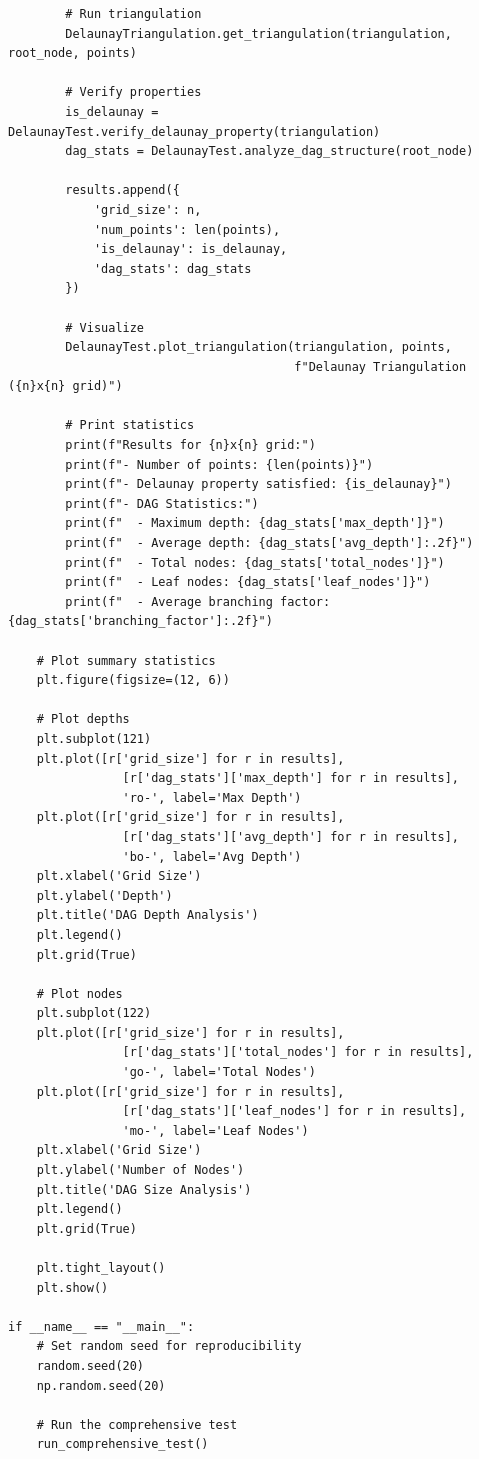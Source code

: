 \documentclass{article}
\begin{document}
\begin{lstlisting}
        # Run triangulation
        DelaunayTriangulation.get_triangulation(triangulation, root_node, points)
        
        # Verify properties
        is_delaunay = DelaunayTest.verify_delaunay_property(triangulation)
        dag_stats = DelaunayTest.analyze_dag_structure(root_node)
        
        results.append({
            'grid_size': n,
            'num_points': len(points),
            'is_delaunay': is_delaunay,
            'dag_stats': dag_stats
        })
        
        # Visualize
        DelaunayTest.plot_triangulation(triangulation, points, 
                                        f"Delaunay Triangulation ({n}x{n} grid)")
        
        # Print statistics
        print(f"Results for {n}x{n} grid:")
        print(f"- Number of points: {len(points)}")
        print(f"- Delaunay property satisfied: {is_delaunay}")
        print(f"- DAG Statistics:")
        print(f"  - Maximum depth: {dag_stats['max_depth']}")
        print(f"  - Average depth: {dag_stats['avg_depth']:.2f}")
        print(f"  - Total nodes: {dag_stats['total_nodes']}")
        print(f"  - Leaf nodes: {dag_stats['leaf_nodes']}")
        print(f"  - Average branching factor: {dag_stats['branching_factor']:.2f}")
    
    # Plot summary statistics
    plt.figure(figsize=(12, 6))
    
    # Plot depths
    plt.subplot(121)
    plt.plot([r['grid_size'] for r in results],
                [r['dag_stats']['max_depth'] for r in results],
                'ro-', label='Max Depth')
    plt.plot([r['grid_size'] for r in results],
                [r['dag_stats']['avg_depth'] for r in results],
                'bo-', label='Avg Depth')
    plt.xlabel('Grid Size')
    plt.ylabel('Depth')
    plt.title('DAG Depth Analysis')
    plt.legend()
    plt.grid(True)
    
    # Plot nodes
    plt.subplot(122)
    plt.plot([r['grid_size'] for r in results],
                [r['dag_stats']['total_nodes'] for r in results],
                'go-', label='Total Nodes')
    plt.plot([r['grid_size'] for r in results],
                [r['dag_stats']['leaf_nodes'] for r in results],
                'mo-', label='Leaf Nodes')
    plt.xlabel('Grid Size')
    plt.ylabel('Number of Nodes')
    plt.title('DAG Size Analysis')
    plt.legend()
    plt.grid(True)
    
    plt.tight_layout()
    plt.show()

if __name__ == "__main__":
    # Set random seed for reproducibility
    random.seed(20)
    np.random.seed(20)
    
    # Run the comprehensive test
    run_comprehensive_test()
\end{lstlisting}
\end{document}
